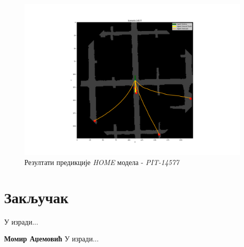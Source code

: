 \documentclass[11pt,oneside]{memoir}
\begin{document}
\begin{figure}[H]
  \centering
  \includegraphics[width=1.0\textwidth]{images/home_PIT_14577.png}
  \caption{Резултати предикције \textit{HOME} модела - \textit{PIT-14577} \label{home-PIT-14577}}
\end{figure}

\chapter{Закључак}
У изради...

\backmatter




\begin{biografija}
\textbf{Момир Аџемовић} 
У изради...
\end{biografija}
\end{document}

